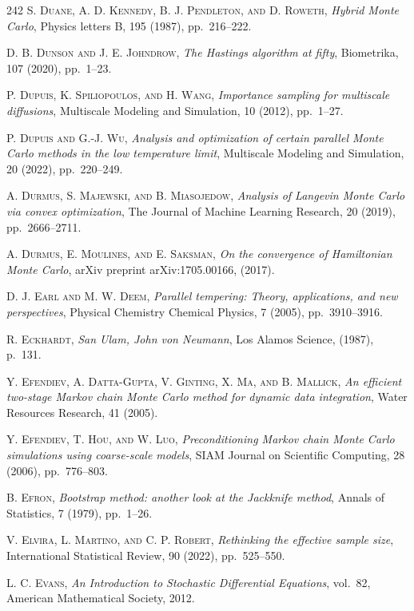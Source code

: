 \begin{thebibliography}{242}
\textsc{S. Duane, A. D. Kennedy, B. J. Pendleton, and D. Roweth},
\textit{Hybrid Monte Carlo},
Physics letters B, 195 (1987), pp.\ 216--222.

\textsc{D. B. Dunson and J. E. Johndrow},
\textit{The Hastings algorithm at fifty},
Biometrika, 107 (2020), pp.\ 1--23.

\textsc{P. Dupuis, K. Spiliopoulos, and H. Wang},
\textit{Importance sampling for multiscale diffusions},
Multiscale Modeling and Simulation, 10 (2012), pp.\ 1--27.

\textsc{P. Dupuis and G.-J. Wu},
\textit{Analysis and optimization of certain parallel Monte Carlo methods in the low temperature limit},
Multiscale Modeling and Simulation, 20 (2022), pp.\ 220--249.

\textsc{A. Durmus, S. Majewski, and B. Miasojedow},
\textit{Analysis of Langevin Monte Carlo via convex optimization},
The Journal of Machine Learning Research, 20 (2019), pp.\ 2666--2711.

\textsc{A. Durmus, E. Moulines, and E. Saksman},
\textit{On the convergence of Hamiltonian Monte Carlo},
arXiv preprint arXiv:1705.00166, (2017).

\textsc{D. J. Earl and M. W. Deem},
\textit{Parallel tempering: Theory, applications, and new perspectives},
Physical Chemistry Chemical Physics, 7 (2005), pp.\ 3910--3916.

\textsc{R. Eckhardt},
\textit{San Ulam, John von Neumann},
Los Alamos Science, (1987), p.\ 131.

\textsc{Y. Efendiev, A. Datta-Gupta, V. Ginting, X. Ma, and B. Mallick},
\textit{An efficient two-stage Markov chain Monte Carlo method for dynamic data integration},
Water Resources Research, 41 (2005).

\textsc{Y. Efendiev, T. Hou, and W. Luo},
\textit{Preconditioning Markov chain Monte Carlo simulations using coarse-scale models},
SIAM Journal on Scientific Computing, 28 (2006), pp.\ 776--803.

\textsc{B. Efron},
\textit{Bootstrap method: another look at the Jackknife method},
Annals of Statistics, 7 (1979), pp.\ 1--26.

\textsc{V. Elvira, L. Martino, and C. P. Robert},
\textit{Rethinking the effective sample size},
International Statistical Review, 90 (2022), pp.\ 525--550.

\textsc{L. C. Evans},
\textit{An Introduction to Stochastic Differential Equations},
vol.\ 82, American Mathematical Society, 2012.


\end{thebibliography}
